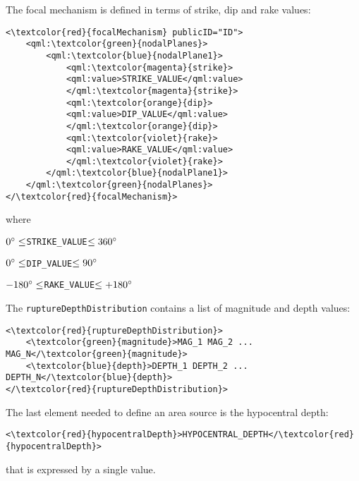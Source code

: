 The focal mechanism is defined in terms of strike, dip and rake values:
\begin{Verbatim}[frame=single, commandchars=\\\{\},fontsize=\normalsize, samepage=true]
<\textcolor{red}{focalMechanism} publicID="ID">
	<qml:\textcolor{green}{nodalPlanes}>
		<qml:\textcolor{blue}{nodalPlane1}>
			<qml:\textcolor{magenta}{strike}>
			<qml:value>STRIKE_VALUE</qml:value>
			</qml:\textcolor{magenta}{strike}>
			<qml:\textcolor{orange}{dip}>
			<qml:value>DIP_VALUE</qml:value>
			</qml:\textcolor{orange}{dip}>
			<qml:\textcolor{violet}{rake}>
			<qml:value>RAKE_VALUE</qml:value>
			</qml:\textcolor{violet}{rake}>
		</qml:\textcolor{blue}{nodalPlane1}>
	</qml:\textcolor{green}{nodalPlanes}>
</\textcolor{red}{focalMechanism}>
 \end{Verbatim}
where
\begin{alltt} \(0\degree \leq\) STRIKE_VALUE \(\leq 360\degree\) \end{alltt}
\begin{alltt} \(0\degree \leq\) DIP_VALUE \(\leq 90\degree\) \end{alltt}
\begin{alltt} \(-180\degree \leq\) RAKE_VALUE \(\leq +180\degree\) \end{alltt}
The \Verb+ruptureDepthDistribution+ contains a list of magnitude and depth values:
\begin{Verbatim}[frame=single, commandchars=\\\{\},fontsize=\normalsize, samepage=true]
<\textcolor{red}{ruptureDepthDistribution}>
	<\textcolor{green}{magnitude}>MAG_1 MAG_2 ... MAG_N</\textcolor{green}{magnitude}>
	<\textcolor{blue}{depth}>DEPTH_1 DEPTH_2 ... DEPTH_N</\textcolor{blue}{depth}>
</\textcolor{red}{ruptureDepthDistribution}>
\end{Verbatim}
The last element needed to define an area source is the hypocentral depth:
\begin{Verbatim}[frame=single, commandchars=\\\{\},fontsize=\normalsize, samepage=true]
<\textcolor{red}{hypocentralDepth}>HYPOCENTRAL_DEPTH</\textcolor{red}{hypocentralDepth}>
\end{Verbatim}
that is expressed by a single value.

